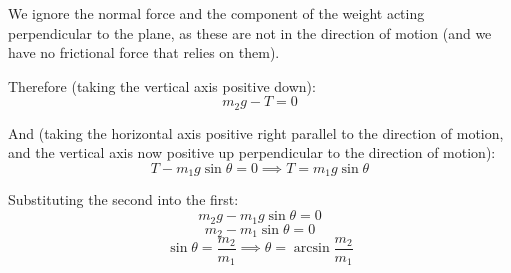 We ignore the normal force and the component of the weight acting perpendicular to the plane, as these are not in the direction of motion (and we have no frictional force that relies on them).

Therefore (taking the vertical axis positive down):
\[
    m_2 g - T = 0
\]

And (taking the horizontal axis positive right parallel to the direction of motion, and the vertical axis now positive up perpendicular to the direction of motion):
\[
  T - m_1 g \sin \theta = 0 \implies T = m_1 g \sin \theta
\]

Substituting the second into the first:
\[
    m_2 g - m_1 g \sin \theta = 0
\]
\[
    m_2 - m_1 \sin \theta = 0
\]
\[
    \sin \theta = \frac{m_2}{m_1} \implies \theta = \arcsin \frac{m_2}{m_1}
\]

